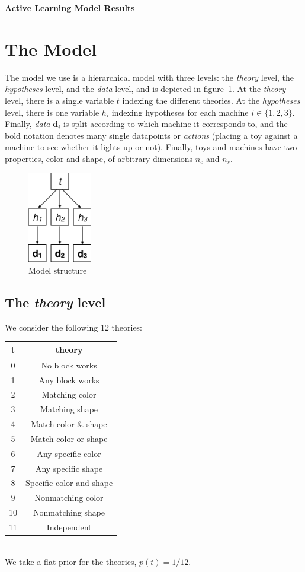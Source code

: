 \documentclass[11pt, a4paper]{article}
\begin{document}
{\noindent \huge \bf Active Learning Model Results}\\


\section*{The Model}
The model we use is a hierarchical model with three levels: the \emph{theory} level, the \emph{hypotheses} level, and the \emph{data} level, and is depicted in figure~\ref{fig:model}. At the \emph{theory} level, there is a single variable $t$ indexing the different theories. At the \emph{hypotheses} level, there is one variable $h_i$ indexing hypotheses for each machine $i\in\{1,2,3\}$. Finally, \emph{data} $\mathbf d_i$ is split according to which machine it corresponds to, and the bold notation denotes many single datapoints or \emph{actions} (placing a toy against a machine to see whether it lights up or not). Finally, toys and machines have two properties, color and shape, of arbitrary dimensions $n_c$ and $n_s$. 
\begin{figure}[ht]
\begin{center}
\includegraphics[width=0.25\textwidth]{Model.png}
\end{center}
\caption{Model structure}
\label{fig:model}
\end{figure}

\subsection*{The \emph{theory} level}
We consider the following 12 theories:\\
\begin{tabular}{|c|c|}
\hline
t & theory \\
\hline
0 & No block works\\
1 & Any block works\\
2 & Matching color\\
3 & Matching shape\\
4 & Match color \& shape\\
5 & Match color or shape\\
6 & Any specific color\\
7 & Any specific shape\\
8 & Specific color and shape\\
9 & Nonmatching color\\
10 & Nonmatching shape\\
11 & Independent \\
\hline
\end{tabular}\\
We take a flat prior for the theories, $p(t)=1/12$. 
\end{document}
